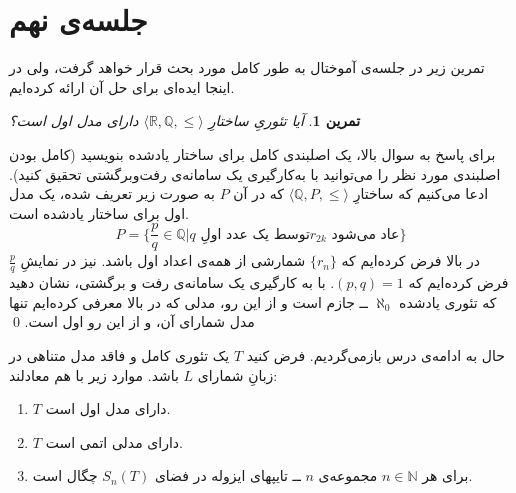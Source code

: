 \documentclass[12pt,a4paper]{report}
\theoremstyle{colorhead}
\newtheorem{tam}[thm]{تمرین}
\begin{document}
\section{جلسه‌ی نهم}
تمرین زیر در جلسه‌ی آموختال به طور کامل مورد بحث قرار خواهد گرفت، ولی در اینجا ایده‌ای برای حل آن ارائه کرده‌ایم. 
\begin{tam}
آیا تئوریِ ساختارِ
$\langle \mathbb{R},\mathbb{Q},\leq \rangle$
دارای مدل اول است؟
\end{tam}
برای پاسخ به سوال بالا، یک اصلبندی کامل برای ساختار یادشده بنویسید (کامل بودن اصلبندی مورد نظر را می‌توانید با به‌کارگیری یک سامانه‌ی رفت‌وبرگشتی تحقیق کنید).
ادعا می‌کنیم که  
ساختارِ
$\langle \mathbb{Q}, P,\leq\rangle$
که در آن
$P$
به صورت زیر تعریف شده،  یک مدل اول برای ساختار یادشده است.
\[
P=\{\frac{p}{q}\in \mathbb{Q}|\text{$q$ توسط یک عدد اولِ
$r_{2k}$ عاد می‌شود}\}
\]
در بالا فرض کرده‌ایم که
$\{r_n\}$
شمارشی از همه‌ی اعداد اول باشد. نیز در نمایشِ
$\frac{p}{q}$
فرض کرده‌ایم که
$(p,q)=1$.
با به کارگیری یک سامانه‌ی رفت و برگشتی، نشان دهید که تئوری یادشده 
$\aleph_0$
ــ
جازم است و از این رو، مدلی که در بالا معرفی کرده‌ایم تنها مدل شمارای آن، و از این رو اول است.
\qed
\par 
حال به ادامه‌ی درس بازمی‌گردیم. 
فرض کنید 
$T$
یک تئوری کامل و فاقد مدل متناهی در زبانِ شمارای 
$L$
باشد. موارد زیر با هم معادلند:
\begin{enumerate}
\item 
$T$
دارای مدل اول است.
\item 
$T$
دارای مدلی اتمی است.
\item 
برای هر
$n\in \mathbb{N}$
مجموعه‌ی
$n$
ــ
تایپهای ایزوله در فضای
$S_n(T)$
چگال است. 
\end{enumerate}
\end{document}
